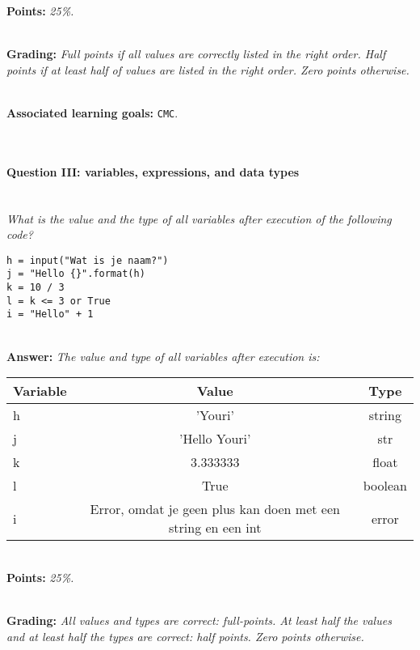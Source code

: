 \textbf{Points:} \textit{25\%.}

\ \\ 

\textbf{Grading:} \textit{Full points if all values are correctly listed in the right order. Half points if at least half of values are listed in the right order. Zero points otherwise.}

\ \\ 

\textbf{Associated learning goals:} \texttt{CMC}.

\ \\ 

\paragraph{Question III: variables, expressions, and data types}

\ \\ 

\textit{What is the value and the type of all variables after execution of the following code?}
\begin{lstlisting}
h = input("Wat is je naam?")
j = "Hello {}".format(h)
k = 10 / 3
l = k <= 3 or True
i = "Hello" + 1
\end{lstlisting}

\ \\ 

\textbf{Answer:} \textit{The value and type of all variables after execution is:}

\begin{tabular}{| l | c | c | }
\hline
\textbf{Variable} & \textbf{Value} & \textbf{Type} \\
\hline
h & 'Youri' & string \\
\hline
j & 'Hello Youri' & str \\
\hline
k & 3.333333 & float \\
\hline
l & True & boolean \\
\hline
i & Error, omdat je geen plus kan doen met een string en een int & error \\
\hline
\end{tabular}

\ \\ 

\textbf{Points:} \textit{25\%.}

\ \\ 

\textbf{Grading:} \textit{All values and types are correct: full-points. At least half the values and at least half the types are correct: half points. Zero points otherwise.}

